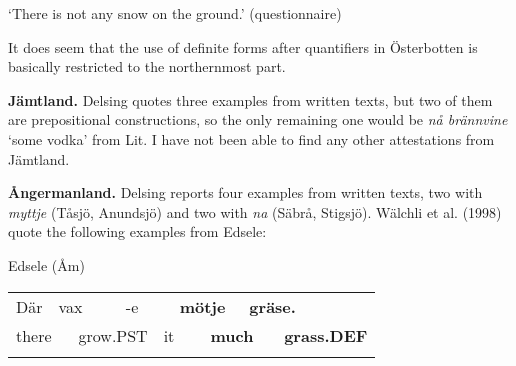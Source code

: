 \begin{styleTranslation}
‘There is not any snow on the ground.’ (questionnaire)

\end{styleTranslation}

\begin{styleBodyTextFirst}
It does seem that the use of definite forms after quantifiers in Österbotten is basically restricted to the northernmost part.

\end{styleBodyTextFirst}

\begin{styleBodytextC}
\textbf{Jämtland. }Delsing quotes three examples from written texts, but two of them are prepositional constructions, so the only remaining one would be \textit{nå brännvine} ‘some vodka’ from Lit. I have not been able to find any other attestations from Jämtland.

\end{styleBodytextC}

\begin{styleBodytextC}
\textbf{Ångermanland.} Delsing reports four examples from written texts, two with \textit{myttje} (Tåsjö, Anundsjö) and two with \textit{na }(Säbrå, Stigsjö). Wälchli et al. (1998) quote the following examples from Edsele:

\end{styleBodytextC}

\begin{listWWNumileveli}
\item {}

\begin{styleExample}
Edsele (Åm)

\end{styleExample}

\end{listWWNumileveli}

\begin{listWWNumxxxviiileveli}
\item {}

\end{listWWNumxxxviiileveli}

\begin{tabular}{llllllllll}
\lsptoprule
Där & \multicolumn{2}{l}{vax

} & \multicolumn{2}{l}{{}-e

} & \multicolumn{2}{l}{{\bfseries mötje}

} & \multicolumn{2}{l}{{\bfseries gräse.}

} & \\
\multicolumn{2}{l}{there

} & \multicolumn{2}{l}{grow.PST

} & \multicolumn{2}{l}{it

} & \multicolumn{2}{l}{{\bfseries much}

} & \multicolumn{2}{l}{{\bfseries grass.DEF}

}\\
\lspbottomrule
\end{tabular}

